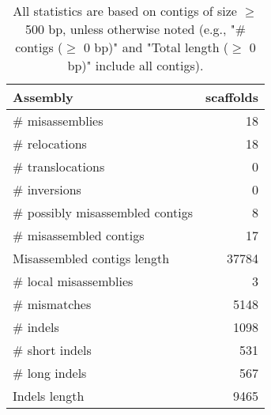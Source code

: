 \documentclass[12pt,a4paper]{article}
\begin{document}
\begin{table}[ht]
\begin{center}
\caption{All statistics are based on contigs of size $\geq$ 500 bp, unless otherwise noted (e.g., "\# contigs ($\geq$ 0 bp)" and "Total length ($\geq$ 0 bp)" include all contigs).}
\begin{tabular}{|l*{1}{|r}|}
\hline
Assembly & scaffolds \\ \hline
\# misassemblies & 18 \\ \hline
\hspace{5mm}\# relocations & 18 \\ \hline
\hspace{5mm}\# translocations & 0 \\ \hline
\hspace{5mm}\# inversions & 0 \\ \hline
\# possibly misassembled contigs & 8 \\ \hline
\# misassembled contigs & 17 \\ \hline
Misassembled contigs length & 37784 \\ \hline
\# local misassemblies & 3 \\ \hline
\# mismatches & 5148 \\ \hline
\# indels & 1098 \\ \hline
\hspace{5mm}\# short indels & 531 \\ \hline
\hspace{5mm}\# long indels & 567 \\ \hline
Indels length & 9465 \\ \hline
\end{tabular}
\end{center}
\end{table}
\end{document}
